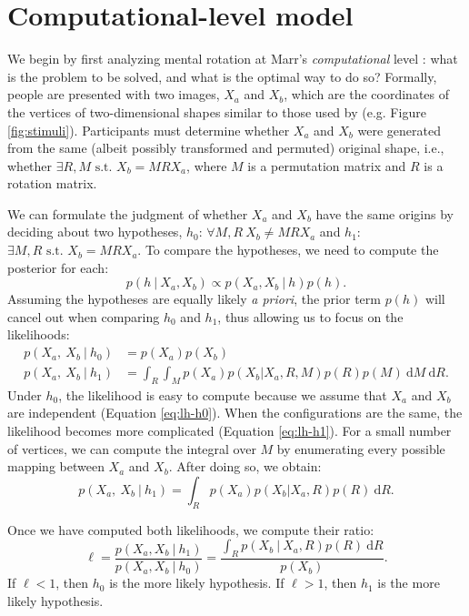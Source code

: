 \documentclass{article} %
\begin{document}
\section{Computational-level model}

We begin by first analyzing mental rotation at Marr's
\textit{computational} level \cite{Marr:1983to}: what is the problem
to be solved, and what is the optimal way to do so?  Formally, people
are presented with two images, $X_a$ and $X_b$, which are the
coordinates of the vertices of two-dimensional shapes similar to those
used by \cite{Cooper:1975wp} (e.g. Figure
\ref{fig:stimuli}). Participants must determine whether $X_a$ and
$X_b$ were generated from the same (albeit possibly transformed and
permuted) original shape, i.e., whether $\exists R,M\textrm{ s.t. }
X_b=MRX_a$, where $M$ is a permutation matrix and $R$ is a rotation
matrix.

We can formulate the judgment of whether $X_a$ and $X_b$ have the same
origins by deciding about two hypotheses, $h_0$: $\forall M,R\ X_b\neq
MRX_a$ and $h_1$: $\exists M,R\textrm{ s.t. } X_b=MRX_a$.  To compare
the hypotheses, we need to compute the posterior for each:
\begin{equation}
p(h\ \vert\ X_a, X_b)\propto p(X_a, X_b\ \vert\ h)p(h).
\end{equation}
Assuming the hypotheses are equally likely \textit{a priori}, the
prior term $p(h)$ will cancel out when comparing $h_0$ and $h_1$, thus
allowing us to focus on the likelihoods:
\begin{align}
  p(X_a,\ X_b\ \vert \ h_0)&=p(X_a)p(X_b) \label{eq:lh-h0}\\
  p(X_a,\ X_b\ \vert \ h_1)&=\int_R\int_M p(X_a) p(X_b\vert X_a,R,M) p(R) p(M)\ \mathrm{d}M\ \mathrm{d}R. \label{eq:lh-h1}
\end{align}
Under $h_0$, the likelihood is easy to compute because we assume that
$X_a$ and $X_b$ are independent (Equation \ref{eq:lh-h0}). When the
configurations are the same, the likelihood becomes more complicated
(Equation \ref{eq:lh-h1}). For a small number of vertices, we can
compute the integral over $M$ by enumerating every possible mapping
between $X_a$ and $X_b$. After doing so, we obtain:
\begin{equation} 
  p(X_a,\ X_b\ \vert \ h_1)=\int_R p(X_a) p(X_b\vert X_a,R) p(R)\ \mathrm{d}R.
\end{equation}

Once we have computed both likelihoods, we compute their ratio:
\begin{equation}
  \ell=\frac{p(X_a, X_b\ \vert \ h_1)}{p(X_a, X_b\ \vert \ h_0)}=\frac{\int_R p(X_b\ \vert\ X_a, R)p(R)\ \mathrm{d}R}{p(X_b)}.
  \label{eq:lh-ratio}
\end{equation}
If $\ell<1$, then $h_0$ is the more likely hypothesis. If $\ell>1$,
then $h_1$ is the more likely hypothesis.
\end{document}
